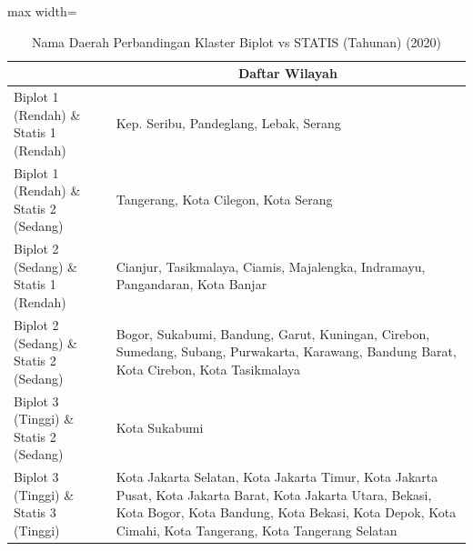 \begin{table}[H]
\centering
\caption{Nama Daerah Perbandingan Klaster Biplot vs STATIS (Tahunan) (2020)} \label{tab:app2biplot_statis_comp_name_2020}
\begin{adjustbox}{max width=\textwidth}
\begin{tabular}{|>{\centering\arraybackslash}p{4cm}|p{10cm}|}
\hline
\multicolumn{1}{|c|}{\textbf{Kategori}} & \multicolumn{1}{c|}{\textbf{Daftar Wilayah}} \\
\hline
Biplot 1 (Rendah) \& Statis 1 (Rendah) & Kep. Seribu, Pandeglang, Lebak, Serang \\
\hline
Biplot 1 (Rendah) \& Statis 2 (Sedang) & Tangerang, Kota Cilegon, Kota Serang \\
\hline
Biplot 2 (Sedang) \& Statis 1 (Rendah) & Cianjur, Tasikmalaya, Ciamis, Majalengka, Indramayu, Pangandaran, Kota Banjar \\
\hline
Biplot 2 (Sedang) \& Statis 2 (Sedang) & Bogor, Sukabumi, Bandung, Garut, Kuningan, Cirebon, Sumedang, Subang, Purwakarta, Karawang, Bandung Barat, Kota Cirebon, Kota Tasikmalaya \\
\hline
Biplot 3 (Tinggi) \& Statis 2 (Sedang) & Kota Sukabumi \\
\hline
Biplot 3 (Tinggi) \& Statis 3 (Tinggi) & Kota Jakarta Selatan, Kota Jakarta Timur, Kota Jakarta Pusat, Kota Jakarta Barat, Kota Jakarta Utara, Bekasi, Kota Bogor, Kota Bandung, Kota Bekasi, Kota Depok, Kota Cimahi, Kota Tangerang, Kota Tangerang Selatan \\
\hline
\end{tabular}
\end{adjustbox}
\end{table}